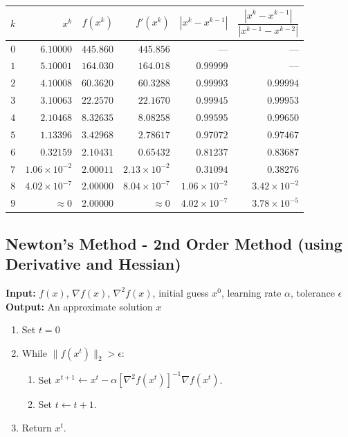 \begin{center}
\renewcommand{\arraystretch}{1.3}
\begin{tabular}{c|rrrrr}
\toprule
$k$ & $x^k$ & $f(x^k)$ & $f'(x^k)$ & $|x^k - x^{k-1}|$ & $\dfrac{|x^k - x^{k-1}|}{|x^{k-1} - x^{k-2}|}$ \\
\midrule
$0$ & $6.10000$ & $445.860$ & $445.856$ & --- & --- \\
$1$ & $5.10001$ & $164.030$ & $164.018$ & $0.99999$ & --- \\
$2$ & $4.10008$ & $60.3620$ & $60.3288$ & $0.99993$ & $0.99994$ \\
$3$ & $3.10063$ & $22.2570$ & $22.1670$ & $0.99945$ & $0.99953$ \\
$4$ & $2.10468$ & $8.32635$ & $8.08258$ & $0.99595$ & $0.99650$ \\
$5$ & $1.13396$ & $3.42968$ & $2.78617$ & $0.97072$ & $0.97467$ \\
$6$ & $0.32159$ & $2.10431$ & $0.65432$ & $0.81237$ & $0.83687$ \\
$7$ & $1.06\times 10^{-2}$ & $2.00011$ & $2.13\times 10^{-2}$ & $0.31094$ & $0.38276$ \\
$8$ & $4.02\times 10^{-7}$ & $2.00000$ & $8.04\times 10^{-7}$ & $1.06\times 10^{-2}$ & $3.42\times 10^{-2}$ \\
$9$ & $\approx 0$ & $2.00000$ & $\approx 0$ & $4.02\times 10^{-7}$ & $3.78\times 10^{-5}$ \\
\bottomrule
\end{tabular}
\par{}\label{tab:NLP-algorithms-newton-convergence}%
\end{center}


\subsection{Newton's Method - 2nd Order Method (using Derivative and Hessian)}

\textbf{Input:} $f(x)$, $\nabla f(x)$, $\nabla^2f(x)$, initial guess $x^0$, learning rate $\alpha$, tolerance $\epsilon$\\
\textbf{Output:} An approximate solution $x$

\begin{enumerate}
\item Set $t= 0$
\item While $\| f(x^t)\|_2 > \epsilon$:
\begin{enumerate}
\item Set $x^{t+1} \leftarrow x^t - \alpha [\nabla^2 f(x^t)]^{-1} \nabla f(x^t)$.
\item Set $t \leftarrow t+1$.
\end{enumerate}
\item Return $x^t$.
\end{enumerate}


